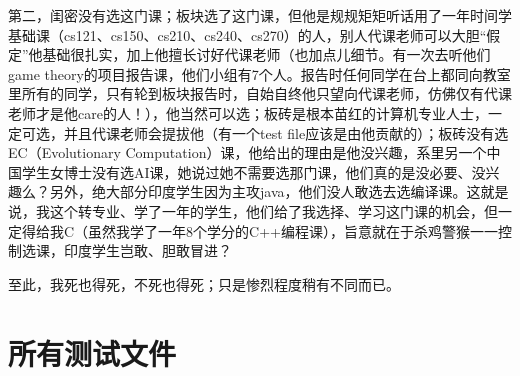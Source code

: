 \documentclass[12pt]{book}
\begin{document}
第二，闺密没有选这门课；板块选了这门课，但他是规规矩矩听话用了一年时间学基础课（cs121、cs150、cs210、cs240、cs270）的人，别人代课老师可以大胆“假定”他基础很扎实，加上他擅长讨好代课老师（也加点儿细节。有一次去听他们game theory的项目报告课，他们小组有7个人。报告时任何同学在台上都同向教室里所有的同学，只有轮到板块报告时，自始自终他只望向代课老师，仿佛仅有代课老师才是他care的人！），他当然可以选；板砖是根本苗红的计算机专业人士，一定可选，并且代课老师会提拔他（有一个test file应该是由他贡献的）；板砖没有选EC（Evolutionary Computation）课，他给出的理由是他没兴趣，系里另一个中国学生女博士没有选AI课，她说过她不需要选那门课，他们真的是没必要、没兴趣么？另外，绝大部分印度学生因为主攻java，他们没人敢选去选编译课。这就是说，我这个转专业、学了一年的学生，他们给了我选择、学习这门课的机会，但一定得给我C（虽然我学了一年8个学分的C++编程课），旨意就在于杀鸡警猴一一控制选课，印度学生岂敢、胆敢冒进？

至此，我死也得死，不死也得死；只是惨烈程度稍有不同而已。

\chapter{所有测试文件}
\label{sec-11}
\end{document}
